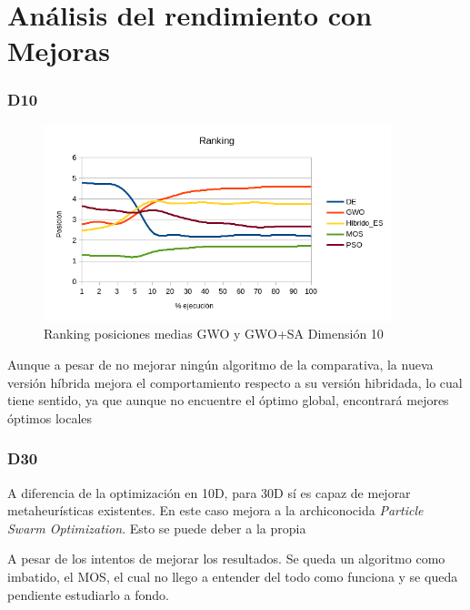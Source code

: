 \documentclass[a4paper, 12.5pt]{report}
\begin{document}
\section{Análisis del rendimiento con Mejoras}

\subsubsection*{D10}




\begin{figure}[H]
    \centering
    \caption{Ranking posiciones medias GWO y GWO+SA Dimensión 10}
    \includegraphics[width=0.9\textwidth]{Resultados/hibrido/Externo/D10/media_posicion.png}

\end{figure}

Aunque a pesar de no mejorar ningún algoritmo de la comparativa, la nueva versión híbrida mejora el comportamiento respecto a su versión hibridada, lo cual tiene sentido, ya que aunque no encuentre el óptimo global, encontrará mejores óptimos locales

\subsubsection*{D30}

A diferencia de la optimización en 10D, para 30D sí es capaz de mejorar metaheurísticas existentes. En este caso mejora a la archiconocida \textit{Particle Swarm Optimization}. Esto se puede deber a la propia

A pesar de los intentos de mejorar los resultados. Se queda un algoritmo como imbatido, el MOS, el cual no llego a entender del todo como funciona y se queda pendiente estudiarlo a fondo.
\end{document}
